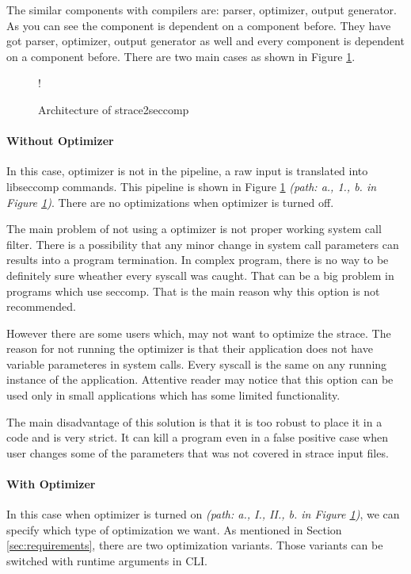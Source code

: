 The similar components with compilers are: parser, optimizer, output generator.
As you can see the component is dependent on a component before.
They have got parser, optimizer, output generator as well and every component is dependent on a component before.
There are two main cases as shown in Figure \ref{fig:tikz:architecture}.

\begin{figure}[H]
  \centering
  \resizebox {\textwidth} {!} {
    
  }
  \caption{Architecture of strace2seccomp}
  \label{fig:tikz:architecture}
\end{figure}

\paragraph{Without Optimizer}
In this case, optimizer is not in the pipeline, a raw input is translated into libseccomp commands.
This pipeline is shown in Figure \ref{fig:tikz:architecture} \textit{(path: a., 1., b. in Figure \ref{fig:tikz:architecture})}.
There are no optimizations when optimizer is turned off.

The main problem of not using a optimizer is not proper working system call filter.
There is a possibility that any minor change in system call parameters can results into a program termination.
In complex program, there is no way to be definitely sure wheather every syscall was caught.
That can be a big problem in programs which use seccomp.
That is the main reason why this option is not recommended.

However there are some users which, may not want to optimize the strace.
The reason for not running the optimizer is that their application does not have variable parameteres in system calls.
Every syscall is the same on any running instance of the application.
Attentive reader may notice that this option can be used only in small applications which has some limited functionality.

The main disadvantage of this solution is that it is too robust to place it in a code and is very strict.
It can kill a program even in a false positive case when user changes some of the parameters that was not covered in strace input files.

\paragraph{With Optimizer}
In this case when optimizer is turned on \textit{(path: a., I., II., b. in Figure \ref{fig:tikz:architecture})}, we can specify which type of optimization we want.
As mentioned in Section \ref{sec:requirements}, there are two optimization variants.
Those variants can be switched with runtime arguments in CLI.

